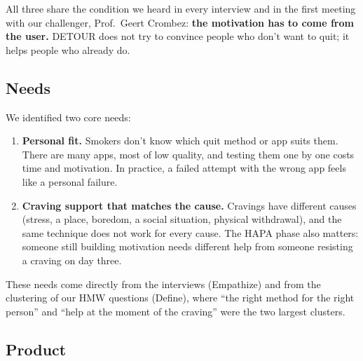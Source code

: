 All three share the condition we heard in every interview and in the first meeting with our challenger, Prof.\ Geert Crombez: \textbf{the motivation has to come from the user.} DETOUR does not try to convince people who don't want to quit; it helps people who already do.

\subsection{Needs}
\label{subsec:needs}

We identified two core needs:

\begin{enumerate}
    \item \textbf{Personal fit.} Smokers don't know which quit method or app suits them. There are many apps, most of low quality, and testing them one by one costs time and motivation. In practice, a failed attempt with the wrong app feels like a personal failure.
    \item \textbf{Craving support that matches the cause.} Cravings have different causes (stress, a place, boredom, a social situation, physical withdrawal), and the same technique does not work for every cause. The HAPA phase also matters: someone still building motivation needs different help from someone resisting a craving on day three.
\end{enumerate}

These needs come directly from the interviews (Empathize) and from the clustering of our HMW questions (Define), where ``the right method for the right person'' and ``help at the moment of the craving'' were the two largest clusters.

\subsection{Product}
\label{subsec:product}

